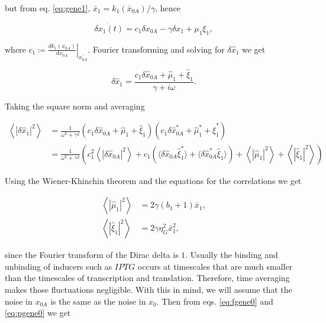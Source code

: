 but from eq. \eqref{eq:gene1}, $\bar{x}_1 = k_1(\bar{x}_{0A})/\gamma$, hence

\begin{equation*}
  \dot{\delta{x_1}(t)}=c_1\delta x_{0A}-\gamma\delta x_1 + \mu_1 \xi_1,
\end{equation*}

where $c_1 \coloneqq \left.\frac{dk_1(x_{0A})}{dx_{0A}}\right|_{\bar{x_{0A}}}$. Fourier transforming and solving for $\delta \hat{x}_1$ we get

\begin{equation*}
  \delta \hat{x}_1=\frac{c_1\delta \hat{x}_{0A}+\hat{\mu}_1+\hat{\xi}_1}{\gamma + i\omega}.
\end{equation*}

Taking the square norm and averaging

\begin{equation}
  \label{eq:pgene1}
  \begin{split}
    \left\langle|\delta \hat{x}_1|^2\right\rangle &= \frac{1}{\omega^2+\gamma^2}\left(c_1\delta \hat{x}_{0A} + \hat{\mu}_1 + \hat{\xi}_1\right)\left(c_1\delta \hat{x}_{0A}^* + \hat{\mu}_1^* + \hat{\xi}_1^*\right)\\
    &=\frac{1}{\omega^2+\gamma^2}\left(c_1^2 \left\langle|\delta \hat{x}_{0A}|^2\right\rangle + c_1\left(\langle\delta \hat{x}_{0A}\hat{\xi}_1^*\rangle+\langle\delta \hat{x}_{0A}^*\hat{\xi}_1\rangle\right) +  \left\langle|\hat{\mu}_1|^2\right\rangle +  \left\langle|\hat{\xi}_1|^2\right\rangle\right)
  \end{split}
\end{equation}

Using the Wiener-Khinchin theorem and the equations for the correlations we get

\begin{align*}
  \left\langle|\hat{\mu}_1|^2\right\rangle &= 2\gamma(b_1+1)\bar{x}_1,\\
  \left\langle|\hat{\xi}_1|^2\right\rangle &= 2\gamma\eta_G^2\bar{x}_1^2,
\end{align*}

since the Fourier transform of the Dirac delta is $1$. Usually the binding and unbinding of inducers such as $IPTG$ occurs at timescales that are much smaller than the timescales of transcription and translation. Therefore, time averaging makes those fluctuations negligible. With this in mind, we will assume that the noise in $x_{0A}$ is the same as the noise in $x_0$. Then from eqs. \eqref{eq:fgene0} and \eqref{eq:pgene0} we get


